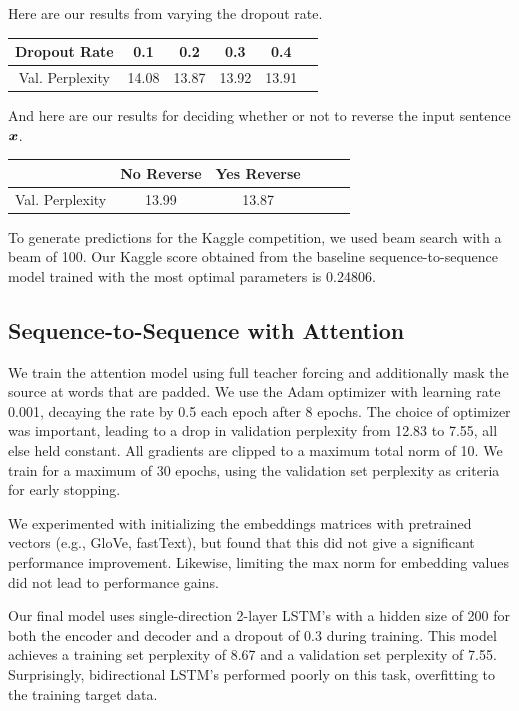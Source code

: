 \documentclass[11pt]{article}
\begin{document}
Here are our results from varying the dropout rate. 

\begin{center}
	\begin{tabular}{ c | c c c c c}
		 Dropout Rate & 0.1 & 0.2 & 0.3 & 0.4   \\
		\hline
		Val. Perplexity & 14.08 & 13.87 & 13.92 & 13.91
	\end{tabular}
\end{center} 

And here are our results for deciding whether or not to reverse the input sentence $\boldsymbol{x}$.  
\begin{center}
	\begin{tabular}{ c | c c c c c}
		  & No Reverse & Yes Reverse   \\
		\hline
		Val. Perplexity & 13.99 & 13.87
	\end{tabular}
\end{center} 

To generate predictions for the Kaggle competition, we used beam search with a beam of 100.  Our Kaggle score obtained from the baseline sequence-to-sequence model trained with the most optimal parameters is 0.24806.   

\subsection{Sequence-to-Sequence with Attention} 
We train the attention model using full teacher forcing and additionally mask the source at words that are padded. We use the Adam optimizer with learning rate 0.001, decaying the rate by 0.5 each epoch after 8 epochs. The choice of optimizer was important, leading to a drop in validation perplexity from 12.83 to 7.55, all else held constant. All gradients are clipped to a maximum total norm of 10. We train for a maximum of 30 epochs, using the validation set perplexity as criteria for early stopping. 

We experimented with initializing the embeddings matrices with pretrained vectors (e.g., GloVe, fastText), but found that this did not give a significant performance improvement. Likewise, limiting the max norm for embedding values did not lead to performance gains.

Our final model uses single-direction 2-layer LSTM's with a hidden size of 200 for both the encoder and decoder and a dropout of 0.3 during training. This model achieves a training set perplexity of 8.67 and a validation set perplexity of 7.55. Surprisingly, bidirectional LSTM's performed poorly on this task, overfitting to the training target data.
\end{document}
